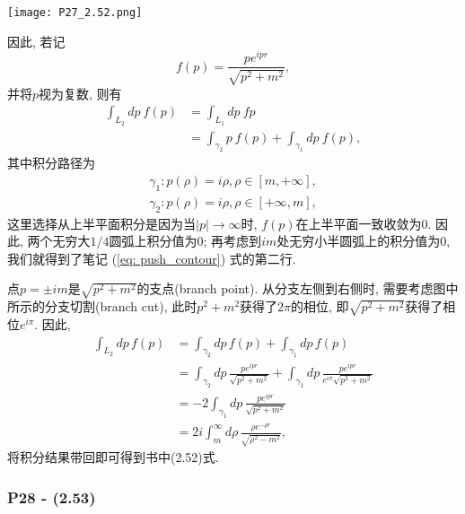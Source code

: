 \documentclass[cn,hazy,blue,11pt,device=normal,chinesefont=founder]{elegantnote}
\begin{document}
\begin{center}
  \texttt{[image: P27\_2.52.png]}  
\end{center}

因此, 若记
\begin{equation}
  f(p) = \frac{pe^{ipr}}{\sqrt{p^2+m^2}}, 
\end{equation}
并将$p$视为复数, 则有
\begin{equation}\label{eq: push_contour}
  \begin{aligned}
    \int_{L_2}dp\ f(p) &= \int_{L_1}dp\ fp \\
    &= \int_{\gamma_2}p\ f(p) + \int_{\gamma_1}dp\ f(p), 
  \end{aligned}
\end{equation}
其中积分路径为
\begin{equation*}
  \begin{aligned}
    \gamma_1: p(\rho) = i\rho, \rho\in[m,+\infty], \\
    \gamma_2: p(\rho) = i\rho, \rho\in[+\infty,m],  
  \end{aligned}
\end{equation*}
这里选择从上半平面积分是因为当$|p|\to\infty$时, $f(p)$在上半平面一致收敛为0. 因此, 两个无穷大$1/4$圆弧上积分值为0; 再考虑到$im$处无穷小半圆弧上的积分值为0, 我们就得到了笔记 (\ref{eq: push_contour}) 式的第二行. 

点$p = \pm im$是$\sqrt{p^2+m^2}$的支点(branch point). 从分支左侧到右侧时, 需要考虑图中所示的分支切割(branch cut), 此时$p^2+m^2$获得了$2\pi$的相位, 即$\sqrt{p^2+m^2}$获得了相位$e^{i\pi}$. 因此, 
\begin{equation}
  \begin{aligned}
    \int_{L_2}dp\,f(p) &= \int_{\gamma_2}dp\,f(p) + \int_{\gamma_1}dp\,f(p)\\
    &= \int_{\gamma_2}dp\,\frac{pe^{ipr}}{\sqrt{p^2+m^2}}
    + \int_{\gamma_1}dp\,\frac{pe^{ipr}}{e^{i\pi}\sqrt{p^2+m^2}}\\
    &= -2\int_{\gamma_1}dp\,\frac{pe^{ipr}}{\sqrt{p^2+m^2}}\\
    &= 2i\int_{m}^{\infty}d\rho\,\frac{\rho e^{-\rho r}}{\sqrt{\rho^2-m^2}}, 
  \end{aligned}
\end{equation}
将积分结果带回即可得到书中(2.52)式. 

\subsubsection{P28 - (2.53)}
\end{document}
